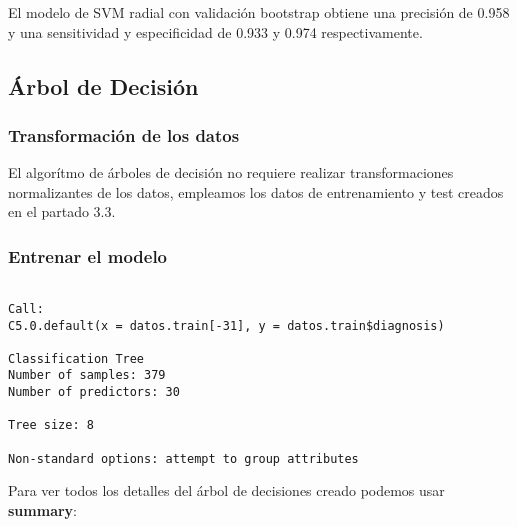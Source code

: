 \documentclass[
]{article}
\newenvironment{Shaded}{\begin{snugshade}}{\end{snugshade}}
\newcommand{\CommentTok}[1]{\textcolor[rgb]{0.56,0.35,0.01}{\textit{#1}}}
\newcommand{\DecValTok}[1]{\textcolor[rgb]{0.00,0.00,0.81}{#1}}
\newcommand{\KeywordTok}[1]{\textcolor[rgb]{0.13,0.29,0.53}{\textbf{#1}}}
\newcommand{\NormalTok}[1]{#1}
\newcommand{\OperatorTok}[1]{\textcolor[rgb]{0.81,0.36,0.00}{\textbf{#1}}}
\newcommand{\StringTok}[1]{\textcolor[rgb]{0.31,0.60,0.02}{#1}}
\begin{document}
El modelo de SVM radial con validación bootstrap obtiene una precisión
de 0.958 y una sensitividad y especificidad de 0.933 y 0.974
respectivamente.

\hypertarget{uxe1rbol-de-decisiuxf3n}{%
\subsection{Árbol de Decisión}\label{uxe1rbol-de-decisiuxf3n}}

\hypertarget{transformaciuxf3n-de-los-datos-2}{%
\subsubsection{Transformación de los
datos}\label{transformaciuxf3n-de-los-datos-2}}

El algorítmo de árboles de decisión no requiere realizar
transformaciones normalizantes de los datos, empleamos los datos de
entrenamiento y test creados en el partado 3.3.

\hypertarget{entrenar-el-modelo-4}{%
\subsubsection{Entrenar el modelo}\label{entrenar-el-modelo-4}}

\begin{Shaded}
\end{Shaded}

\begin{verbatim}

Call:
C5.0.default(x = datos.train[-31], y = datos.train$diagnosis)

Classification Tree
Number of samples: 379 
Number of predictors: 30 

Tree size: 8 

Non-standard options: attempt to group attributes
\end{verbatim}

Para ver todos los detalles del árbol de decisiones creado podemos usar
\textbf{summary}:
\end{document}
